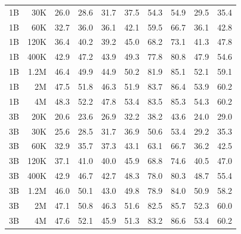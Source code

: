 \begin{table}[t]
\begin{tabulary}{1.0\textwidth}{l r c c c c c c c c}
1B    & 30K   & 26.0 & 28.6 & 31.7 & 37.5 & 54.3 & 54.9 & 29.5 & 35.4 \\
1B    & 60K   & 32.7 & 36.0 & 36.1 & 42.1 & 59.5 & 66.7 & 36.1 & 42.8 \\
1B    & 120K  & 36.4 & 40.2 & 39.2 & 45.0 & 68.2 & 73.1 & 41.3 & 47.8 \\
1B    & 400K  & 42.9 & 47.2 & 43.9 & 49.3 & 77.8 & 80.8 & 47.9 & 54.6 \\
1B    & 1.2M    & 46.4 & 49.9 & 44.9 & 50.2 & 81.9 & 85.1 & 52.1 & 59.1 \\
1B    & 2M    & 47.5 & 51.8 & 46.3 & 51.9 & 83.7 & 86.4 & 53.9 & 60.2 \\
1B    & 4M    & 48.3 & 52.2 & 47.8 & 53.4 & 83.5 & 85.3 & 54.3 & 60.2 \\
\midrule[0.25pt]
3B    & 20K   & 20.6 & 23.6 & 26.9 & 32.2 & 38.2 & 43.6 & 24.0 & 29.0 \\
3B    & 30K   & 25.6 & 28.5 & 31.7 & 36.9 & 50.6 & 53.4 & 29.2 & 35.3 \\
3B    & 60K   & 32.9 & 35.7 & 37.3 & 43.1 & 63.1 & 66.7 & 36.2 & 42.5 \\
3B    & 120K  & 37.1 & 41.0 & 40.0 & 45.9 & 68.8 & 74.6 & 40.5 & 47.0 \\
3B    & 400K  & 42.9 & 46.7 & 42.7 & 48.3 & 78.0 & 80.3 & 48.7 & 55.4 \\
3B    & 1.2M    & 46.0 & 50.1 & 43.0 & 49.8 & 78.9 & 84.0 & 50.9 & 58.2 \\
3B    & 2M    & 47.1 & 50.8 & 46.3 & 51.6 & 82.5 & 85.7 & 52.3 & 60.0 \\
3B    & 4M    & 47.6 & 52.1 & 45.9 & 51.3 & 83.2 & 86.6 & 53.4 & 60.2 \\
    \bottomrule
  \end{tabulary}
\end{table}

